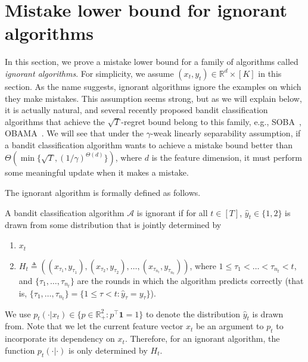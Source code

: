 \section{Mistake lower bound for ignorant algorithms}
\label{section:mistake-lower-bound-for-ignorant-algorithms}

In this section, we prove a mistake lower bound for a family of algorithms called \textit{ignorant algorithms}.
For simplicity, we assume $(x_t, y_t)\in\mathbb{R}^{d}\times [K]$ in this section.
As the name suggests, ignorant algorithms ignore the examples on which they make mistakes.
This assumption seems strong, but as we will explain below, it is actually natural,
and several recently proposed bandit classification algorithms that achieve the $\sqrt{T}$-regret bound belong to this family, e.g., SOBA~\citep{Beygelzimer-Orabona-Zhang-2017}, OBAMA~\citep{Foster-Kale-Luo-Mohri-Sridharan-2018}.
We will see that under the $\gamma$-weak linearly separability assumption,
if a bandit classification algorithm wants to achieve a mistake bound better than $\Theta\left(\min\{\sqrt{T}, (1/\gamma)^{\Theta(d)}\}\right)$, where $d$ is the feature dimension, it must perform some meaningful update when it makes a mistake.

The ignorant algorithm is formally defined as follows.
\begin{definition} \label{definition:ignorant-algorithm}
    A bandit classification algorithm $\mathcal{A}$ is ignorant if for all $t\in[T]$,
    $\widehat y_t\in \{1,2\}$ is drawn from some distribution that is jointly determined by
    \begin{enumerate}
        \item $x_t$
        \item $H_t\triangleq \left( (x_{\tau_1}, y_{\tau_1}), (x_{\tau_2}, y_{\tau_2}), \ldots, (x_{\tau_{n_t}}, y_{\tau_{n_t}}) \right)$,
        where $1 \leq \tau_1<\ldots <\tau_{n_t} < t$, and $\{\tau_1, \ldots, \tau_{n_t}\}$
        are the rounds in which the algorithm predicts correctly (that is,
        $\{\tau_1, \ldots, \tau_{n_t}\} = \{1\leq \tau<t: \widehat y_\tau=y_\tau\}$).
    \end{enumerate}
    We use $p_t(\cdot|x_t)\in \{p\in \mathbb{R}_+^2: p^\top\mathbf{1}=1\}$ to denote the distribution $\widehat y_t$ is drawn from. Note that we let the current feature vector $x_t$ be an argument to $p_t$ to incorporate its dependency on $x_t$. Therefore, for an ignorant algorithm, the function $p_t(\cdot|\cdot)$ is only determined by $H_t$.
\end{definition}

